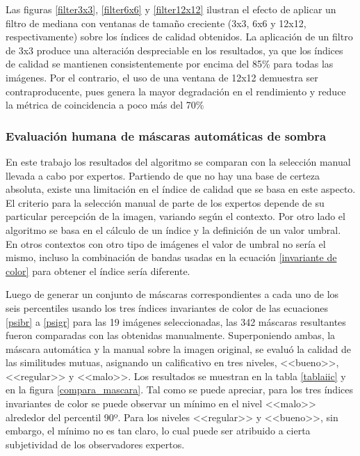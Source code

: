 Las figuras \ref{filter3x3}, \ref{filter6x6} y \ref{filter12x12} ilustran el efecto de aplicar un filtro de mediana con ventanas de tamaño creciente (3x3, 6x6 y 12x12, respectivamente) sobre los índices de calidad obtenidos. La aplicación de un filtro de 3x3 produce una alteración despreciable en los resultados, ya que los índices de calidad se mantienen consistentemente por encima del 85\% para todas las imágenes. Por el contrario, el uso de una ventana de 12x12 demuestra ser contraproducente, pues genera la mayor degradación en el rendimiento y reduce la métrica de coincidencia a poco más del 70\%

\subsubsection{Evaluación humana de máscaras automáticas de sombra}

En este trabajo los resultados del algoritmo se comparan con la selección manual llevada a cabo por expertos. Partiendo de que no hay una base de certeza absoluta, existe una limitación en el índice de calidad que se basa en este aspecto. El criterio para la selección manual de parte de los expertos depende de su particular percepción de la imagen, variando según el contexto. Por otro lado el algoritmo se basa en el cálculo de un índice y la definición de un valor umbral. En otros contextos con otro tipo de imágenes el valor de umbral no sería el mismo, incluso la combinación de bandas usadas en la ecuación \ref{invariante de color} para obtener el índice sería diferente.

Luego de generar un conjunto de máscaras correspondientes a cada uno de los seis percentiles usando los tres índices invariantes de color de las ecuaciones \ref{psibr} a \ref{psigr} para las 19 imágenes seleccionadas, las 342 máscaras resultantes fueron comparadas con las obtenidas manualmente. Superponiendo ambas, la máscara automática y la manual sobre la imagen original, se evaluó la calidad de las similitudes mutuas, asignando un calificativo en tres niveles, <<bueno>>, <<regular>> y <<malo>>. Los resultados se muestran en la tabla \ref{tablaiic} y en la figura \ref{compara_mascara}. Tal como se puede apreciar, para los tres índices invariantes de color se puede observar un mínimo en el nivel <<malo>> alrededor del percentil 90º. Para los niveles <<regular>> y <<bueno>>, sin embargo, el mínimo no es tan claro, lo cual puede ser atribuido a cierta subjetividad de los observadores expertos.

 



